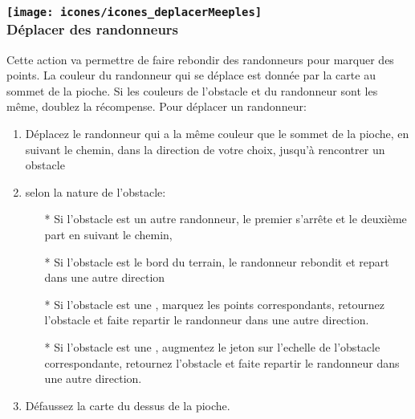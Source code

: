 \subsubsection*{\texttt{[image: icones/icones\_deplacerMeeples]} \\ Déplacer des randonneurs}

Cette action va permettre de faire rebondir des randonneurs pour marquer des points. La couleur du randonneur qui se déplace est donnée par la carte au sommet de la pioche. Si les couleurs de l'obstacle et du randonneur sont les même, doublez la récompense. Pour déplacer un randonneur:
\begin{enumerate}
\item Déplacez le randonneur qui a la même couleur que le sommet de la pioche, en suivant le chemin, dans la direction de votre choix, jusqu'à rencontrer un obstacle
\item selon la nature de l'obstacle:
\begin{itemize}
\item[*] Si l'obstacle est un autre randonneur, le premier s'arrête et le deuxième part en suivant le chemin,
\item[*] Si l'obstacle est le bord du terrain, le randonneur rebondit et repart dans une autre direction
\item[*] Si l'obstacle est une \faceValeur, marquez les points correspondants, retournez l'obstacle et faite repartir le randonneur dans une autre direction.
\item[*] Si l'obstacle est une \faceObstacle, augmentez le jeton sur l'echelle de l'obstacle correspondante, retournez l'obstacle et faite repartir le randonneur dans une autre direction.
\end{itemize}
\item Défaussez la carte du dessus de la pioche.
\end{enumerate}

